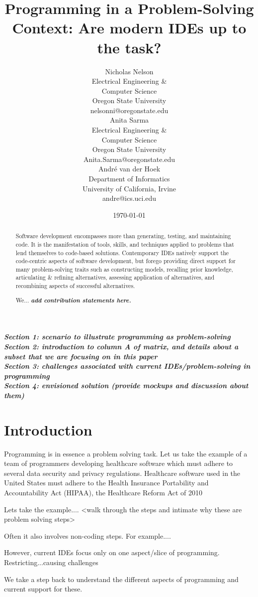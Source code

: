 \documentclass{ppig}
\title{Programming in a Problem-Solving Context: Are modern IDEs up to the task?}
\author{Nicholas Nelson \\
  Electrical Engineering \&\\ Computer Science \\
  Oregon State University \\
  nelsonni@oregonstate.edu \\
  \And
  Anita Sarma \\
  Electrical Engineering \&\\ Computer Science \\
  Oregon State University \\
  Anita.Sarma@oregonstate.edu \\
  \And
  André van der Hoek \\
  Department of Informatics \\
  University of California, Irvine \\
  andre@ics.uci.edu}
\date{\today}
\newcommand{\bold}[1]{\textit{\textbf{\color{aoblue}#1}}}
\begin{document}
\maketitle
\thispagestyle{empty}

\begin{abstract}
Software development encompasses more than generating, testing, and maintaining code.
It is the manifestation of tools, skills, and techniques applied to problems that lend themselves to code-based solutions.
Contemporary IDEs natively support the code-centric aspects of software development, but forego providing direct support for many problem-solving traits such as constructing models, recalling prior knowledge, articulating \& refining alternatives, assessing application of alternatives, and recombining aspects of successful alternatives.

We... \bold{add contribution statements here.}
\end{abstract}

\bold{Section 1: scenario to illustrate programming as problem-solving\\
Section 2: introduction to column A of matrix, and details about a subset that we are focusing on in this paper\\
Section 3: challenges associated with current IDEs/problem-solving in programming\\
Section 4: envisioned solution (provide mockups and discussion about them)}

\section{Introduction}

Programming is in essence a problem solving task.
Let us take the example of a team of programmers developing healthcare software which must adhere to several data security and privacy regulations.
Healthcare software used in the United States must adhere to the Health Insurance Portability and Accountability Act (HIPAA), the Healthcare Reform Act of 2010


Lets take the example.... <walk through the steps and intimate why these are problem solving steps>

Often it also involves non-coding steps. For example....

However, current IDEs focus only on one aspect/slice of programming. Restricting...causing challenges 

We take a step back to understand the different aspects of programming and current support for these.
\end{document}
